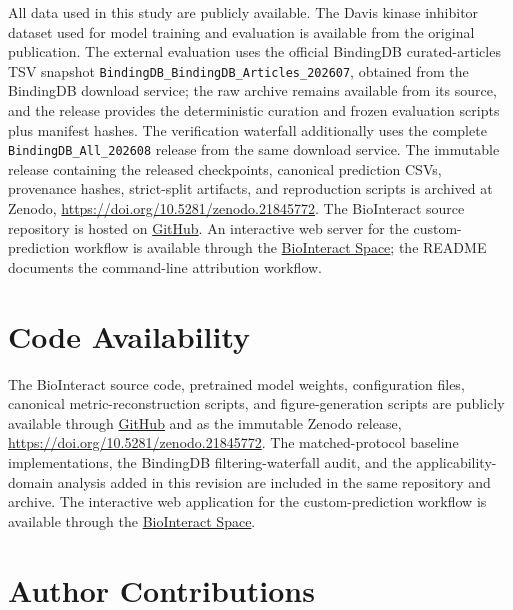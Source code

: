 \documentclass[fleqn,10pt]{wlscirep}
\begin{document}
All data used in this study are publicly available. The Davis kinase inhibitor
dataset used for model training and evaluation is available from the original
publication.\cite{davis2011comprehensive} The external evaluation uses the official
BindingDB curated-articles TSV snapshot
\texttt{BindingDB\_BindingDB\_Articles\_202607}, obtained from the BindingDB
download service;\cite{gilson2016bindingdb} the raw archive remains available from
its source, and the release provides the deterministic curation and frozen
evaluation scripts plus manifest hashes.
\begingroup\color{red}
The verification waterfall additionally uses the complete
\texttt{BindingDB\_All\_202608} release from the same download service.
\endgroup
The immutable release containing the
released checkpoints, canonical prediction CSVs, provenance hashes, strict-split
artifacts, and reproduction scripts is archived at Zenodo,
\url{https://doi.org/10.5281/zenodo.21845772}. The BioInteract source repository
is hosted on \href{https://github.com/Liubo-520/bio-intelligence}{GitHub}. An interactive web
server for the custom-prediction workflow is available through the
\href{https://huggingface.co/spaces/AI4deeperScience/BioInteract}{BioInteract Space}; the README
documents the command-line attribution workflow.

\section*{Code Availability}

The BioInteract source code, pretrained model weights, configuration files,
canonical metric-reconstruction scripts, and figure-generation scripts are
publicly available through \href{https://github.com/Liubo-520/bio-intelligence}{GitHub} and
as the immutable Zenodo release, \url{https://doi.org/10.5281/zenodo.21845772}.
\begingroup\color{red}
The matched-protocol baseline implementations, the BindingDB filtering-waterfall
audit, and the applicability-domain analysis added in this revision are included
in the same repository and archive.
\endgroup
The interactive web
application for the custom-prediction workflow is available through the
\href{https://huggingface.co/spaces/AI4deeperScience/BioInteract}{BioInteract Space}.

\section*{Author Contributions}
\end{document}
